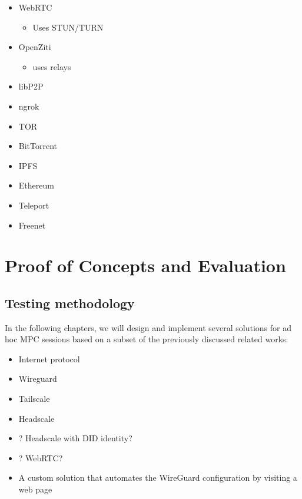 \begin{itemize}
\tightlist
\item
  WebRTC

  \begin{itemize}
  \tightlist
  \item
    Uses STUN/TURN
  \end{itemize}
\item
  OpenZiti

  \begin{itemize}
  \tightlist
  \item
    uses relays
  \end{itemize}
\item
  libP2P
\item
  ngrok
\item
  TOR
\item
  BitTorrent
\item
  IPFS
\item
  Ethereum
\item
  Teleport
\item
  Freenet
\end{itemize}

\hypertarget{proof-of-concepts-and-evaluation}{%
\part{Proof of Concepts and
Evaluation}\label{proof-of-concepts-and-evaluation}}

\hypertarget{testing-methodology}{%
\chapter{Testing methodology}\label{testing-methodology}}

In the following chapters, we will design and implement several
solutions for ad hoc MPC sessions based on a subset of the previously
discussed related works:

\begin{itemize}
\tightlist
\item
  Internet protocol
\item
  Wireguard
\item
  Tailscale
\item
  Headscale
\item
  ? Headscale with DID identity?
\item
  ? WebRTC?
\item
  A custom solution that automates the WireGuard configuration by
  visiting a web page
\end{itemize}

